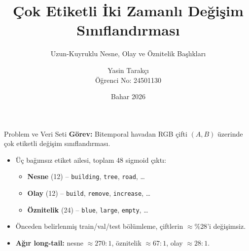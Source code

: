 \documentclass[10pt,aspectratio=169]{beamer}
\title{Çok Etiketli İki Zamanlı Değişim Sınıflandırması}
\subtitle{Uzun-Kuyruklu Nesne, Olay ve Öznitelik Başlıkları}
\author{Yasin Tarakçı \\ \small Öğrenci No: 24501130}
\institute{Yıldız Teknik Üniversitesi \\ BLM5135 -- Derin Öğrenme ve Yapay Sinir Ağları}
\date{Bahar 2026}
\begin{document}
\maketitle

\begin{frame}{Problem ve Veri Seti}
  \textbf{Görev:} Bitemporal havadan RGB çifti $(A, B)$ üzerinde çok etiketli değişim sınıflandırması.
  \vspace{0.6em}
  \begin{itemize}
    \item Üç bağımsız etiket ailesi, toplam 48 sigmoid çıktı:
      \begin{itemize}
        \item \textbf{Nesne} (12) -- \texttt{building}, \texttt{tree}, \texttt{road}, \ldots
        \item \textbf{Olay} (12) -- \texttt{build}, \texttt{remove}, \texttt{increase}, \ldots
        \item \textbf{Öznitelik} (24) -- \texttt{blue}, \texttt{large}, \texttt{empty}, \ldots
      \end{itemize}
    \item Önceden belirlenmiş train/val/test bölümleme, çiftlerin $\approx \%28$'i değişimsiz.
    \item \textbf{Ağır long-tail:} nesne $\approx 270{:}1$, öznitelik $\approx 67{:}1$, olay $\approx 28{:}1$.
  \end{itemize}
\end{frame}
\end{document}
